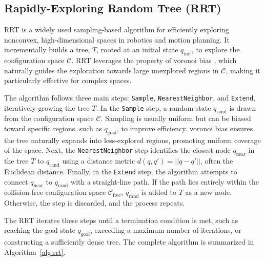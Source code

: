 \subsection{Rapidly-Exploring Random Tree (RRT)}
RRT is a widely used sampling-based algorithm for efficiently exploring nonconvex, high-dimensional spaces in robotics and motion planning. It incrementally builds a tree, \(T\), rooted at an initial state \(q_\text{init}\), to explore the configuration space \(\mathcal{C}\). RRT leverages the property of voronoi bias \cite{kuffner2000efficient}, which naturally guides the exploration towards large unexplored regions in \(\mathcal{C}\), making it particularly effective for complex spaces.

The algorithm follows three main steps: \texttt{Sample}, \texttt{NearestNeighbor}, and \texttt{Extend}, iteratively growing the tree \(T\). In the \texttt{Sample} step, a random state \(q_\text{rand}\) is drawn from the configuration space \(\mathcal{C}\). Sampling is usually uniform but can be biased toward specific regions, such as \(q_\text{goal}\), to improve efficiency. voronoi bias ensures the tree naturally expands into less-explored regions, promoting uniform coverage of the space. Next, the \texttt{NearestNeighbor} step identifies the closest node \(q_\text{near}\) in the tree \(T\) to \(q_\text{rand}\) using a distance metric $d(q, q') = ||q - q'||$, often the Euclidean distance. Finally, in the \texttt{Extend} step, the algorithm attempts to connect \(q_\text{near}\) to \(q_\text{rand}\) with a straight-line path. If the path lies entirely within the collision-free configuration space \(\mathcal{C}_\text{free}\), \(q_\text{rand}\) is added to \(T\) as a new node. Otherwise, the step is discarded, and the process repeats.

The RRT iterates these steps until a termination condition is met, such as reaching the goal state \(q_\text{goal}\), exceeding a maximum number of iterations, or constructing a sufficiently dense tree. The complete algorithm is summarized in Algorithm~\ref{alg:rrt}.




